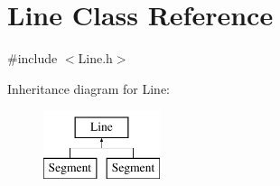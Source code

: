 \hypertarget{classLine}{\section{Line Class Reference}
\label{classLine}
}


{\ttfamily \#include $<$Line.\-h$>$}

Inheritance diagram for Line\-:\begin{figure}[H]
\begin{center}
\leavevmode
\includegraphics[height=2.000000cm]{classLine}
\end{center}
\end{figure}
